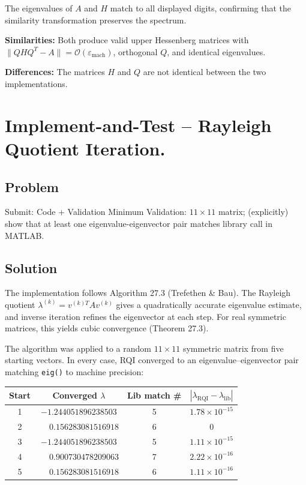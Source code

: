 \documentclass[11pt]{article}
\begin{document}
The eigenvalues of $A$ and $H$ match to all displayed digits, confirming that the similarity transformation preserves the spectrum.

\textbf{Similarities:} Both produce valid upper Hessenberg matrices with $\|QHQ^T-A\| = \mathcal{O}(\varepsilon_{\mathrm{mach}})$, orthogonal $Q$, and identical eigenvalues.

\textbf{Differences:} The matrices $H$ and $Q$ are not identical between the two implementations.



\newpage
\section{Implement-and-Test -- Rayleigh Quotient Iteration.}

\subsection{Problem}
Submit: Code + Validation
Minimum Validation: $11\times11$ matrix; (explicitly) show that at least one eigenvalue-eigenvector pair matches library call in MATLAB.

\subsection{Solution}

The implementation follows Algorithm 27.3 (Trefethen \& Bau). The Rayleigh quotient $\lambda^{(k)} = v^{(k)T}\!Av^{(k)}$ gives a quadratically accurate eigenvalue estimate, and inverse iteration refines the eigenvector at each step. For real symmetric matrices, this yields cubic convergence (Theorem 27.3).

The algorithm was applied to a random $11\times11$ symmetric matrix from five starting vectors. In every case, RQI converged to an eigenvalue--eigenvector pair matching \verb|eig()| to machine precision:

\begin{center}
\begin{tabular}{cccc}
\hline
Start & Converged $\lambda$ & Lib match \# & $|\lambda_{\mathrm{RQI}} - \lambda_{\mathrm{lib}}|$ \\
\hline
1 & $-1.244051896238503$ & 5 & $1.78\times10^{-15}$ \\
2 & $\phantom{-}0.156283081516918$ & 6 & $0$ \\
3 & $-1.244051896238503$ & 5 & $1.11\times10^{-15}$ \\
4 & $\phantom{-}0.900730478209063$ & 7 & $2.22\times10^{-16}$ \\
5 & $\phantom{-}0.156283081516918$ & 6 & $1.11\times10^{-16}$ \\
\hline
\end{tabular}
\end{center}
\end{document}
